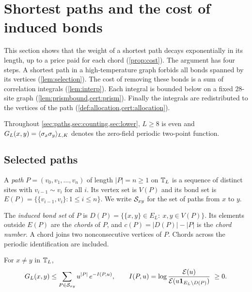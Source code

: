 \section{Shortest paths and the cost of induced bonds}\label{sec:paths}

This section shows that the weight of a shortest path decays exponentially in its length, up to a price paid for each chord (\cref{prop:cost}). The argument has four steps. A shortest path in a high-temperature graph forbids all bonds spanned by its vertices (\cref{lem:selection}). The cost of removing these bonds is a sum of correlation integrals (\cref{lem:interp}). Each integral is bounded below on a fixed $28$-site graph (\cref{lem:prismbound,cert:prism}). Finally the integrals are redistributed to the vertices of the path (\cref{def:allocation,cert:allocation}).

Throughout \cref{sec:paths,sec:counting,sec:lower}, $L\ge8$ is even and $G_L(x,y)=\langle \sigma_x\sigma_y\rangle_{L,K}$ denotes the zero-field periodic two-point function.

\subsection{Selected paths}

A \emph{path} $P=(v_0,v_1,\dots,v_n)$ of length $|P|=n\ge1$ on $\mathbb T_L$ is a sequence of distinct sites with $v_{i-1}\sim v_i$ for all $i$. Its vertex set is $V(P)$ and its bond set is $E(P)=\{\{v_{i-1},v_i\}:1\le i\le n\}$. We write $\mathcal S_{xy}$ for the set of paths from $x$ to $y$.

\begin{definition}\label{def:induced}
The \emph{induced bond set} of $P$ is $D(P)=\{\{x,y\}\in E_L:\ x,y\in V(P)\}$. Its elements outside $E(P)$ are the \emph{chords} of $P$, and $c(P)=|D(P)|-|P|$ is the \emph{chord number}. A chord joins two nonconsecutive vertices of $P$. Chords across the periodic identification are included.
\end{definition}

\begin{lemma}\label{lem:selection}
For $x\ne y$ in $\mathbb T_L$,
\begin{equation}\label{eq:selection}
 G_L(x,y)\le\sum_{P\in\mathcal S_{xy}}u^{|P|}\,e^{-I(P,u)},\qquad
 I(P,u)=\log\frac{\mathcal E(u)}{\mathcal E(u\mathbf 1_{E_L\setminus D(P)})}\ \ge0 .
\end{equation}
\end{lemma}

